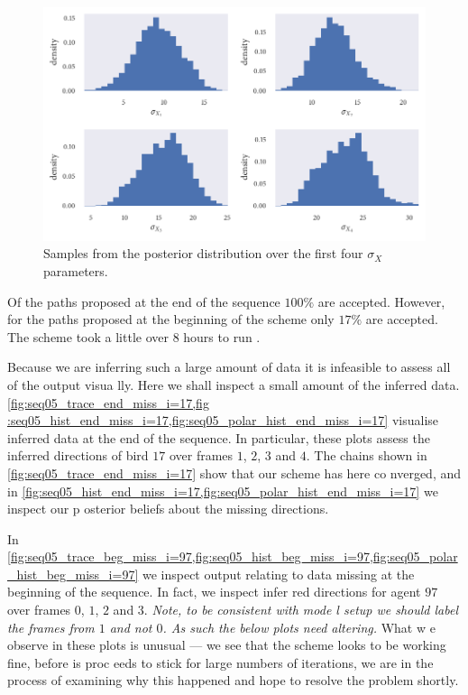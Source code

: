\begin{figure}[!tbp]
	\includegraphics{output/seq05_hist_sigmax.pdf}
	\caption{Samples from the posterior distribution over the first four $\sigma_X$ parameters.}
	\label{fig:hist_sigmax}
\end{figure}

Of the paths proposed at the end of the sequence $100\%$ are accepted. However, for the paths proposed 
at the beginning of the scheme only $17\%$ are accepted. The scheme took a little over $8$ hours to run
.

Because we are inferring such a large amount of data it is infeasible to assess all of the output visua
lly. Here we shall inspect a small amount of the inferred data. \cref{fig:seq05_trace_end_miss_i=17,fig
:seq05_hist_end_miss_i=17,fig:seq05_polar_hist_end_miss_i=17} visualise inferred data at the end of the
 sequence. In particular, these plots assess the inferred directions of bird $17$ over frames $1$, $2$,
 $3$ and $4$. The chains shown in \cref{fig:seq05_trace_end_miss_i=17} show that our scheme has here co
nverged, and in \cref{fig:seq05_hist_end_miss_i=17,fig:seq05_polar_hist_end_miss_i=17} we inspect our p
osterior beliefs about the missing directions.

In \cref{fig:seq05_trace_beg_miss_i=97,fig:seq05_hist_beg_miss_i=97,fig:seq05_polar_hist_beg_miss_i=97}
 we inspect output relating to data missing at the beginning of the sequence. In fact, we inspect infer
red directions for agent $97$ over frames $0$, $1$, $2$ and $3$. \emph{Note, to be consistent with mode
l setup we should label the frames from $1$ and not $0$. As such the below plots need altering.} What w
e observe in these plots is unusual --- we see that the scheme looks to be working fine, before is proc
eeds to stick for large numbers of iterations, we are in the process of examining why this happened and
 hope to resolve the problem shortly.

